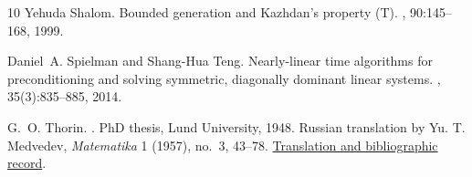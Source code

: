 \documentclass[11pt]{article}
\numberwithin{equation}{section}
\theoremstyle{definition}
\theoremstyle{remark}
\begin{document}
\begin{thebibliography}{10}
Yehuda Shalom.
\newblock Bounded generation and {Kazhdan}'s property {(T)}.
, 90:145--168,
  1999.

Daniel~A. Spielman and Shang-Hua Teng.
\newblock Nearly-linear time algorithms for preconditioning and solving
  symmetric, diagonally dominant linear systems.
,
  35(3):835--885, 2014.

G.~O. Thorin.
.
\newblock PhD thesis, Lund University, 1948.
\newblock Russian translation by Yu. T. Medvedev, \emph{Matematika} 1 (1957),
  no.~3, 43--78. \href{https://www.mathnet.ru/eng/mat17}{Translation and
  bibliographic record}.

\end{thebibliography}
\end{document}
